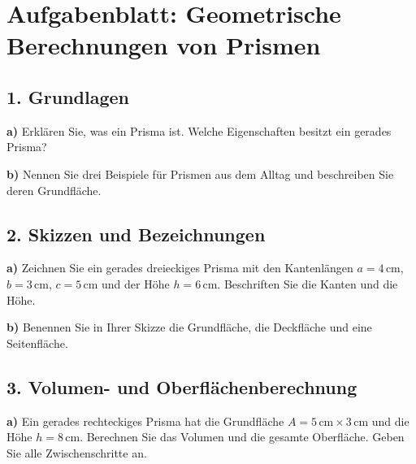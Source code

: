 
\section*{Aufgabenblatt: Geometrische Berechnungen von Prismen}

\subsection*{1. Grundlagen}
\textbf{a)} Erklären Sie, was ein Prisma ist. Welche Eigenschaften besitzt ein gerades Prisma?

\textbf{b)} Nennen Sie drei Beispiele für Prismen aus dem Alltag und beschreiben Sie deren Grundfläche.

\subsection*{2. Skizzen und Bezeichnungen}
\textbf{a)} Zeichnen Sie ein gerades dreieckiges Prisma mit den Kantenlängen $a=4\,\mathrm{cm}$, $b=3\,\mathrm{cm}$, $c=5\,\mathrm{cm}$ und der Höhe $h=6\,\mathrm{cm}$. Beschriften Sie die Kanten und die Höhe.

\begin{center}
\end{center}

\textbf{b)} Benennen Sie in Ihrer Skizze die Grundfläche, die Deckfläche und eine Seitenfläche.

\subsection*{3. Volumen- und Oberflächenberechnung}
\textbf{a)} Ein gerades rechteckiges Prisma hat die Grundfläche $A=5\,\mathrm{cm} \times 3\,\mathrm{cm}$ und die Höhe $h=8\,\mathrm{cm}$. Berechnen Sie das Volumen und die gesamte Oberfläche. Geben Sie alle Zwischenschritte an.


